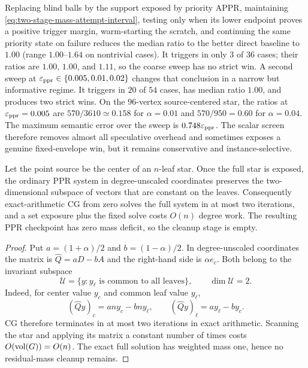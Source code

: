 Replacing blind balls by the support exposed by priority APPR, maintaining
\cref{eq:two-stage-mass-attempt-interval}, testing only when its lower endpoint
proves a positive trigger margin, warm-starting the scratch, and continuing
the same priority state on failure reduces the median ratio to the better
direct baseline to $1.00$ (range $1.00$--$1.64$ on nontrivial cases).  It
triggers in only $3$ of $36$ cases; their ratios are $1.00$, $1.00$, and
$1.11$, so the coarse sweep has no strict win.  A second sweep at
$\varepsilon_{\mathrm{ppr}}\in\{0.005,0.01,0.02\}$ changes that conclusion in a narrow but
informative regime.  It triggers in $20$ of $54$ cases, has median ratio
$1.00$, and produces two strict wins.  On the 96-vertex source-centered star,
the ratios at $\varepsilon_{\mathrm{ppr}}=0.005$ are $570/3610\simeq0.158$ for $\alpha=0.01$
and $570/950=0.60$ for $\alpha=0.04$.  The maximum semantic error over the
sweep is $0.748\varepsilon_{\mathrm{ppr}}$.  The scalar screen therefore removes almost all
speculative overhead and sometimes exposes a genuine fixed-envelope win,
but it remains conservative and instance-selective.

\begin{proposition}
\label{prop:two-stage-star-two-krylov}
Let the point source be the center of an $n$-leaf star.  Once the full star is
exposed, the ordinary PPR system in degree-unscaled coordinates preserves
the two-dimensional subspace of vectors that are constant on the leaves.
Consequently exact-arithmetic CG from zero solves the full system in at most
two iterations, and a set exposure plus the fixed solve costs $O(n)$ degree
work.  The resulting PPR checkpoint has zero mass deficit, so the cleanup
stage is empty.
\end{proposition}

\begin{proof}
Put $a=(1+\alpha)/2$ and $b=(1-\alpha)/2$.  In degree-unscaled coordinates
the matrix is $\widehat Q=aD-bA$ and the right-hand side is
$\alpha e_c$.  Both belong to the invariant subspace
\begin{equation*}
 \mathcal U=\{y:y_\ell\text{ is common to all leaves}\},
 \qquad \dim\mathcal U=2.
\end{equation*}
Indeed, for center value $y_c$ and common leaf value $y_\ell$,
\begin{equation*}
 (\widehat Qy)_c=an y_c-bn y_\ell,
 \qquad
 (\widehat Qy)_\ell=ay_\ell-by_c.
\end{equation*}
CG therefore terminates in at most two iterations in exact arithmetic.
Scanning the star and applying its matrix a constant number of times costs
$O(\operatorname{vol}(G))=O(n)$.  The exact full solution has weighted mass one, hence no
residual-mass cleanup remains.
\end{proof}

